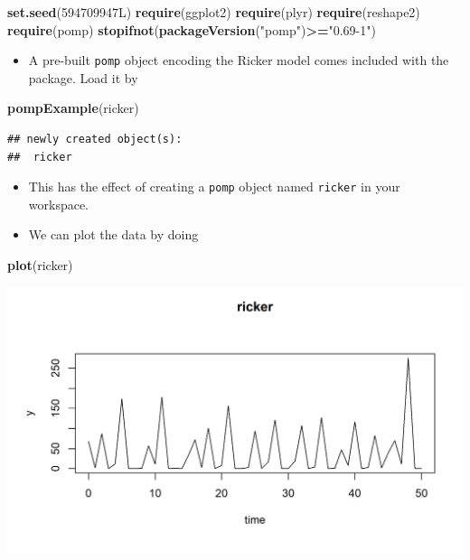 \documentclass[]{article}
\newenvironment{Shaded}{\begin{snugshade}}{\end{snugshade}}
\newcommand{\KeywordTok}[1]{\textcolor[rgb]{0.13,0.29,0.53}{\textbf{#1}}}
\newcommand{\StringTok}[1]{\textcolor[rgb]{0.31,0.60,0.02}{#1}}
\newcommand{\OperatorTok}[1]{\textcolor[rgb]{0.81,0.36,0.00}{\textbf{#1}}}
\newcommand{\NormalTok}[1]{#1}
\providecommand{\tightlist}{%
  \setlength{\itemsep}{0pt}\setlength{\parskip}{0pt}}
\begin{document}
\begin{Shaded}
\begin{Highlighting}[]
\KeywordTok{set.seed}\NormalTok{(594709947L)}
\KeywordTok{require}\NormalTok{(ggplot2)}
\KeywordTok{require}\NormalTok{(plyr)}
\KeywordTok{require}\NormalTok{(reshape2)}
\KeywordTok{require}\NormalTok{(pomp)}
\KeywordTok{stopifnot}\NormalTok{(}\KeywordTok{packageVersion}\NormalTok{(}\StringTok{"pomp"}\NormalTok{)}\OperatorTok{>=}\StringTok{"0.69-1"}\NormalTok{)}
\end{Highlighting}
\end{Shaded}

\begin{itemize}
\tightlist
\item
  A pre-built \texttt{pomp} object encoding the Ricker model comes
  included with the package. Load it by
\end{itemize}

\begin{Shaded}
\begin{Highlighting}[]
\KeywordTok{pompExample}\NormalTok{(ricker)}
\end{Highlighting}
\end{Shaded}

\begin{verbatim}
## newly created object(s):
##  ricker
\end{verbatim}

\begin{itemize}
\item
  This has the effect of creating a \texttt{pomp} object named
  \texttt{ricker} in your workspace.
\item
  We can plot the data by doing
\end{itemize}

\begin{Shaded}
\begin{Highlighting}[]
\KeywordTok{plot}\NormalTok{(ricker)}
\end{Highlighting}
\end{Shaded}

\begin{center}\includegraphics{figure/intro-plot-ricker-1} \end{center}
\end{document}
